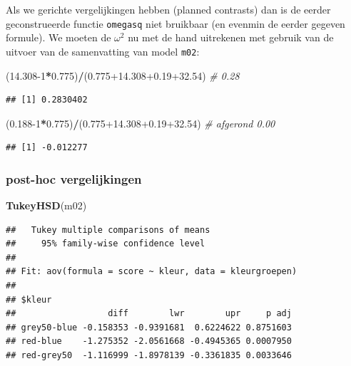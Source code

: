 \documentclass[
]{book}
\newenvironment{Shaded}{\begin{snugshade}}{\end{snugshade}}
\newcommand{\CommentTok}[1]{\textcolor[rgb]{0.56,0.35,0.01}{\textit{#1}}}
\newcommand{\DecValTok}[1]{\textcolor[rgb]{0.00,0.00,0.81}{#1}}
\newcommand{\FloatTok}[1]{\textcolor[rgb]{0.00,0.00,0.81}{#1}}
\newcommand{\FunctionTok}[1]{\textcolor[rgb]{0.13,0.29,0.53}{\textbf{#1}}}
\newcommand{\NormalTok}[1]{#1}
\newcommand{\SpecialCharTok}[1]{\textcolor[rgb]{0.81,0.36,0.00}{\textbf{#1}}}
\begin{document}
Als we gerichte vergelijkingen hebben (planned contrasts) dan is de eerder geconstrueerde functie \texttt{omegasq} niet bruikbaar (en evenmin de eerder gegeven formule). We moeten de \(\omega^2\) nu met de hand uitrekenen met gebruik van de uitvoer van de samenvatting van model \texttt{m02}:

\begin{Shaded}
\begin{Highlighting}[]
\NormalTok{(}\FloatTok{14.308}\DecValTok{{-}1}\SpecialCharTok{*}\FloatTok{0.775}\NormalTok{)}\SpecialCharTok{/}\NormalTok{(}\FloatTok{0.775+14.308+0.19+32.54}\NormalTok{) }\CommentTok{\# 0.28}
\end{Highlighting}
\end{Shaded}

\begin{verbatim}
## [1] 0.2830402
\end{verbatim}

\begin{Shaded}
\begin{Highlighting}[]
\NormalTok{(}\FloatTok{0.188}\DecValTok{{-}1}\SpecialCharTok{*}\FloatTok{0.775}\NormalTok{)}\SpecialCharTok{/}\NormalTok{(}\FloatTok{0.775+14.308+0.19+32.54}\NormalTok{) }\CommentTok{\# afgerond 0.00}
\end{Highlighting}
\end{Shaded}

\begin{verbatim}
## [1] -0.012277
\end{verbatim}

\subsubsection{post-hoc vergelijkingen}\label{post-hoc-vergelijkingen}

\begin{Shaded}
\begin{Highlighting}[]
\FunctionTok{TukeyHSD}\NormalTok{(m02)}
\end{Highlighting}
\end{Shaded}

\begin{verbatim}
##   Tukey multiple comparisons of means
##     95% family-wise confidence level
## 
## Fit: aov(formula = score ~ kleur, data = kleurgroepen)
## 
## $kleur
##                  diff        lwr        upr     p adj
## grey50-blue -0.158353 -0.9391681  0.6224622 0.8751603
## red-blue    -1.275352 -2.0561668 -0.4945365 0.0007950
## red-grey50  -1.116999 -1.8978139 -0.3361835 0.0033646
\end{verbatim}
\end{document}
